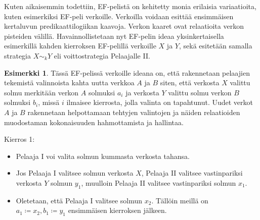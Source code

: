 \documentclass[finnish]{tktltiki2}
\theoremstyle{definition}
\newtheorem{esim}[lau]{Esimerkki}
\theoremstyle{remark}
\begin{document}
Kuten aikaisemmin todettiin, EF-pelistä on kehitetty monia erilaisia variaatioita, kuten esimerkiksi EF-peli verkoille. Verkoilla voidaan esittää ensimmäisen kertaluvun predikaattilogiikan kaavoja. Verkon kaaret ovat relaatioita verkon pisteiden välillä. Havainnollistetaan nyt EF-pelin ideaa yksinkertaisella esimerkillä kahden kierroksen EF-pelillä verkoille $X$ ja $Y$, sekä esitetään samalla strategia $X \sim_k Y$ eli voittostrategia Pelaajalle II.

\begin{esim}
Tässä EF-pelissä verkoille ideana on, että rakennetaan pelaajien tekemistä valinnoista kahta uutta verkkoa $A$ ja $B$ siten, että verkosta $X$ valittu solmu merkitään verkon $A$ solmuksi $a_i$ ja verkosta $Y$ valittu solmu verkon $B$ solmuksi $b_i$, missä $i$ ilmaisee kierrosta, jolla valinta on tapahtunut. Uudet verkot $A$ ja $B$ rakennetaan helpottamaan tehtyjen valintojen ja näiden relaatioiden muodostaman kokonaisuuden hahmottamista ja hallintaa.

\begin{center}
\end{center}


Kierros 1:
\begin{itemize}
  \item Pelaaja I voi valita solmun kummasta verkosta tahansa.
  \item Jos Pelaaja I valitsee solmun verkosta $X$, Pelaaja II valitsee vastinpariksi verkosta $Y$ solmun $y_1$, muulloin Pelaaja II valitsee vastinpariksi solmun $x_1$.
  \item Oletetaan, että Pelaaja I valitsee solmun $x_2$. Tällöin meillä on $a_1 \coloneqq x_2, b_1 \coloneqq y_1$ ensimmäisen kierroksen jälkeen.
\end{itemize}


\end{esim}
\end{document}
